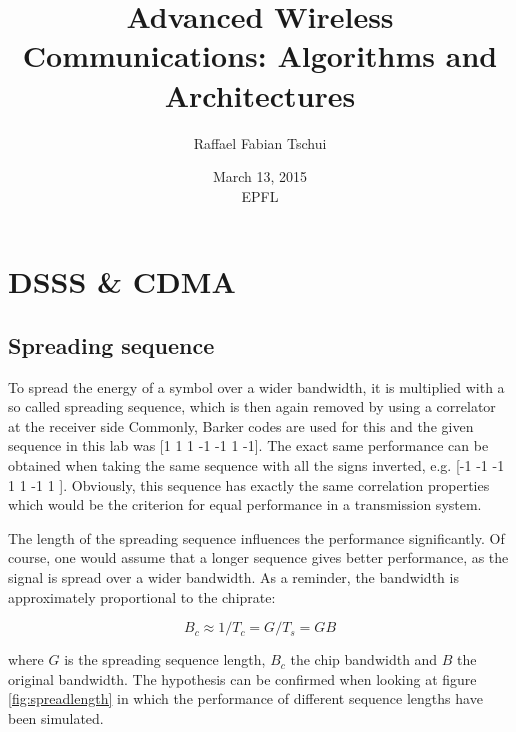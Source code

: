 \documentclass[a4paper]{article}
\begin{document}
\title{Advanced Wireless Communications: Algorithms and Architectures  \\ }
\author{Raffael Fabian Tschui}
\date{March 13, 2015 \\ EPFL} %

\maketitle

  
\section{DSSS \& CDMA}
\subsection{Spreading sequence}

To spread the energy of a symbol over a wider bandwidth, it is multiplied with a so called spreading sequence, which is then again removed by using a correlator at the receiver side Commonly, Barker codes are used for this and the given sequence in this lab was [1 1 1 -1 -1 1 -1]. The exact same performance can be obtained when taking the same sequence with all the signs inverted, e.g. [-1 -1 -1 1 1 -1 1 ]. Obviously, this sequence has exactly the same correlation properties which would be the criterion for equal performance in a transmission system.

The length of the spreading sequence influences the performance significantly. Of course, one would assume that a longer sequence gives better performance, as the signal is spread over a wider bandwidth. As a reminder, the bandwidth is approximately proportional to the chiprate:

\begin{equation}
B_{c} \approx 1/T_{c} = G/T_{s}= G B
\end{equation}

where $G$ is the spreading sequence length, $B_{c}$ the chip bandwidth and $B$ the original bandwidth. The hypothesis can be confirmed when looking at figure \ref{fig:spreadlength} in which the performance of different sequence lengths have been simulated.
\end{document}
